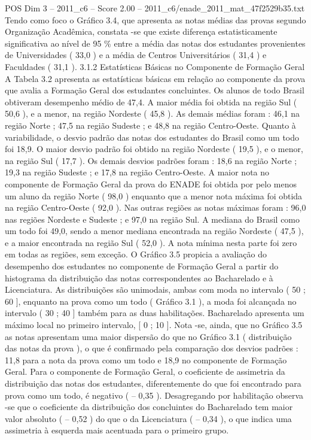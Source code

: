 \begin{textsample}{POS Dim 3 – 2011\_c6 – Score 2.00 – 2011\_c6/enade\_2011\_mat\_47f2529b35.txt}
Tendo como foco o Gráfico 3.4, que apresenta as notas médias das provas segundo Organização Acadêmica, constata -se que existe diferença estatisticamente significativa ao nível de 95 \% entre a média das notas dos estudantes provenientes de Universidades ( 33,0 ) e a média de Centros Universitários ( 31,4 ) e Faculdades ( 31,1 ). 3.1.2 Estatísticas Básicas no Componente de Formação Geral A Tabela 3.2 apresenta as estatísticas básicas em relação ao componente da prova que avalia a Formação Geral dos estudantes concluintes.
Os alunos de todo Brasil obtiveram desempenho médio de 47,4.
A maior média foi obtida na região Sul ( 50,6 ), e a menor, na região Nordeste ( 45,8 ).
As demais médias foram : 46,1 na região Norte ; 47,5 na região Sudeste ; e 48,8 na região Centro-Oeste.
Quanto à variabilidade, o desvio padrão das notas dos estudantes do Brasil como um todo foi 18,9.
O maior desvio padrão foi obtido na região Nordeste ( 19,5 ), e o menor, na região Sul ( 17,7 ).
Os demais desvios padrões foram : 18,6 na região Norte ; 19,3 na região Sudeste ; e 17,8 na região Centro-Oeste.
A maior nota no componente de Formação Geral da prova do ENADE foi obtida por pelo menos um aluno da região Norte ( 98,0 ) enquanto que a menor nota máxima foi obtida na região Centro-Oeste ( 92,0 ).
Nas outras regiões as notas máximas foram : 96,0 nas regiões Nordeste e Sudeste ; e 97,0 na região Sul.
A mediana do Brasil como um todo foi 49,0, sendo a menor mediana encontrada na região Nordeste ( 47,5 ), e a maior encontrada na região Sul ( 52,0 ).
A nota mínima nesta parte foi zero em todas as regiões, sem exceção.
O Gráfico 3.5 propicia a avaliação do desempenho dos estudantes no componente de Formação Geral a partir do histograma da distribuição das notas correspondentes ao Bacharelado e à Licenciatura.
As distribuições são unimodais, ambas com moda no intervalo ( 50 ; 60 ], enquanto na prova como um todo ( Gráfico 3.1 ), a moda foi alcançada no intervalo ( 30 ; 40 ] também para as duas habilitações.
Bacharelado apresenta um máximo local no primeiro intervalo, [ 0 ; 10 ].
Nota -se, ainda, que no Gráfico 3.5 as notas apresentam uma maior dispersão do que no Gráfico 3.1 ( distribuição das notas da prova ), o que é confirmado pela comparação dos desvios padrões : 11,8 para a nota da prova como um todo e 18,9 no componente de Formação Geral.
Para o componente de Formação Geral, o coeficiente de assimetria da distribuição das notas dos estudantes, diferentemente do que foi encontrado para prova como um todo, é negativo ( – 0,35 ).
Desagregando por habilitação observa -se que o coeficiente da distribuição dos concluintes do Bacharelado tem maior valor absoluto ( – 0,52 ) do que o da Licenciatura ( – 0,34 ), o que indica uma assimetria à esquerda mais acentuada para o primeiro grupo.

\end{textsample}
